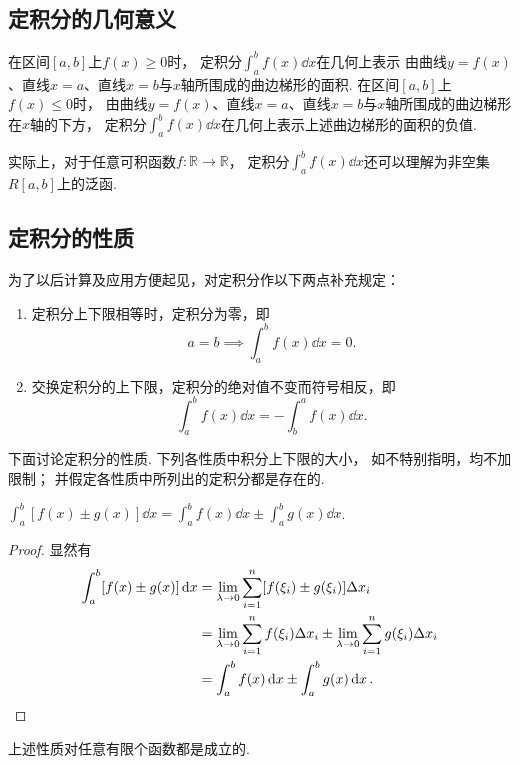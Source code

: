 \subsection{定积分的几何意义}
在区间\([a,b]\)上\(f(x) \geq 0\)时，
定积分\(\int_a^b f(x) \dd{x}\)在几何上表示
由曲线\(y=f(x)\)、直线\(x=a\)、直线\(x=b\)与\(x\)轴所围成的曲边梯形的面积.
在区间\([a,b]\)上\(f(x) \leq 0\)时，
由曲线\(y=f(x)\)、直线\(x=a\)、直线\(x=b\)与\(x\)轴所围成的曲边梯形在\(x\)轴的下方，
定积分\(\int_a^b f(x) \dd{x}\)在几何上表示上述曲边梯形的面积的负值.

实际上，对于任意可积函数\(f\colon \mathbb{R} \to \mathbb{R}\)，
定积分\(\int_a^b f(x) \dd{x}\)还可以理解为非空集\(R[a,b]\)上的泛函.

\subsection{定积分的性质}
\begin{definition}
为了以后计算及应用方便起见，对定积分作以下两点补充规定：
\begin{enumerate}
\item 定积分上下限相等时，定积分为零，即
\begin{equation}\label{equation:定积分.上下限相等的定积分为零}
    a=b \implies \int_a^b f(x) \dd{x}=0.
\end{equation}
\item 交换定积分的上下限，定积分的绝对值不变而符号相反，即
\begin{equation}\label{equation:定积分.交换上下限改变定积分的符号}
\int_a^b f(x) \dd{x}
= - \int_b^a f(x) \dd{x}.
\end{equation}
\end{enumerate}
\end{definition}

下面讨论定积分的性质.
下列各性质中积分上下限的大小，
如不特别指明，均不加限制；
并假定各性质中所列出的定积分都是存在的.
\begin{property}\label{theorem:定积分.定积分性质1}
\(\int_a^b [f(x) \pm g(x)] \dd{x}
= \int_a^b f(x) \dd{x} \pm \int_a^b g(x) \dd{x}\).
\begin{proof}
显然有\begin{align*}
	\int_a^b [f(x) \pm g(x)] \dd{x}
	&= \lim_{\lambda\to0}
		\sum_{i=1}^n [f(\xi_i) \pm g(\xi_i)] \Delta x_i \\
	&= \lim_{\lambda\to0}
		\sum_{i=1}^n f(\xi_i) \Delta x_i
		\pm
		\lim_{\lambda\to0}
		\sum_{i=1}^n g(\xi_i) \Delta x_i \\
	&= \int_a^b f(x) \dd{x} \pm \int_a^b g(x) \dd{x}.
	\qedhere
\end{align*}
\end{proof}
\end{property}
上述性质对任意有限个函数都是成立的.

